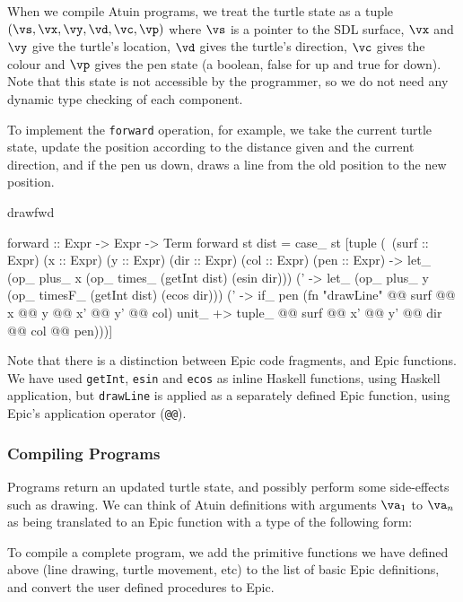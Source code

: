 When we compile Atuin programs, we treat the turtle state as a tuple
$(\vs,\vx,\vy,\vd,\vc,\vp)$ where $\vs$ is a pointer to the SDL
surface, $\vx$ and $\vy$ give the turtle's location, $\vd$ gives the
turtle's direction, $\vc$ gives the colour and $\vp$ gives the pen
state (a boolean, false for up and true for down). Note that this
state is not accessible by the programmer, so we do not need any
dynamic type checking of each component.

To implement the \texttt{forward} operation, for example, we take the
current turtle state, update the position according to the distance
given and the current direction, and if the pen us down, draws a line
from the old position to the new position.

\begin{SaveVerbatim}{drawfwd}

forward :: Expr -> Expr -> Term
forward st dist = case_ st 
  [tuple (\ (surf :: Expr) (x :: Expr) (y :: Expr) 
            (dir :: Expr) (col :: Expr) (pen :: Expr) -> 
    let_ (op_ plus_ x (op_ times_ (getInt dist) (esin dir)))
      (\x' -> let_ (op_ plus_ y (op_ timesF_ (getInt dist) (ecos dir)))
      (\y' -> if_ pen (fn "drawLine" @@ surf @@ x @@ y 
                                     @@ x' @@ y' @@ col) unit_ +>
              tuple_ @@ surf @@ x' @@ y' @@ dir @@ col @@ pen)))]

\end{SaveVerbatim}

\noindent
Note that there is a distinction between Epic code fragments, and Epic
functions. We have used \texttt{getInt}, \texttt{esin} and
\texttt{ecos} as inline Haskell functions, using Haskell application,
but \texttt{drawLine} is applied as a separately defined Epic
function, using Epic's application operator (\texttt{@@}).

\subsubsection{Compiling Programs}

Programs return an updated turtle state, and possibly perform some
side-effects such as drawing. We can think of Atuin definitions with
arguments $\va_1$ to $\va_n$ as being translated to an Epic function
with a type of the following form:


To compile a complete program, we add the primitive functions we have
defined above (line drawing, turtle movement, etc) to the list of
basic Epic definitions, and convert the user defined procedures to Epic.

